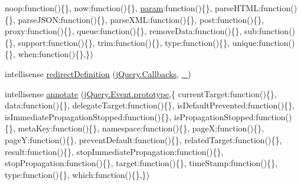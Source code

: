 \begin{DoxyCompactItemize}
\textquotesingle{}noop\textquotesingle{}\+:function()\{\}, \textquotesingle{}now\textquotesingle{}\+:function()\{\}, \textquotesingle{}\hyperlink{_scripts_2jquery-1_810_82_8min_8js_ae8915303d11557d1b001bc56b6195251}{param}\textquotesingle{}\+:function()\{\}, \textquotesingle{}parse\+H\+T\+ML\textquotesingle{}\+:function()\{\}, \textquotesingle{}parse\+J\+S\+ON\textquotesingle{}\+:function()\{\}, \textquotesingle{}parse\+X\+ML\textquotesingle{}\+:function()\{\}, \textquotesingle{}post\textquotesingle{}\+:function()\{\}, \textquotesingle{}proxy\textquotesingle{}\+:function()\{\}, \textquotesingle{}queue\textquotesingle{}\+:function()\{\}, \textquotesingle{}remove\+Data\textquotesingle{}\+:function()\{\}, \textquotesingle{}sub\textquotesingle{}\+:function()\{\}, \textquotesingle{}support\textquotesingle{}\+:function()\{\}, \textquotesingle{}trim\textquotesingle{}\+:function()\{\}, \textquotesingle{}type\textquotesingle{}\+:function()\{\}, \textquotesingle{}unique\textquotesingle{}\+:function()\{\}, \textquotesingle{}when\textquotesingle{}\+:function()\{\},\})
\item 
intellisense \hyperlink{jquery-1_810_82_8intellisense_8js_abeba0f4b2ef2a8a655ac517b37c9fc63}{redirect\+Definition} (\hyperlink{jquery-1_810_82_8intellisense_8js_add8d59d25831bb9b171fdbee8a18795b}{j\+Query.\+Callbacks}, \hyperlink{jquery-1_810_82_8intellisense_8js_af58a9af35e2376001e3219aef7e0bda3}{\+\_})
\item 
intellisense \hyperlink{jquery-1_810_82_8intellisense_8js_a55098c3abe028707512d17d570d3486b}{annotate} (\hyperlink{_scripts_2jquery-1_810_82_8js_ab5e5d0976552f788d31448ed049ae4a4}{j\+Query.\+Event.\+prototype},\{ \textquotesingle{}current\+Target\textquotesingle{}\+:function()\{\}, \textquotesingle{}data\textquotesingle{}\+:function()\{\}, \textquotesingle{}delegate\+Target\textquotesingle{}\+:function()\{\}, \textquotesingle{}is\+Default\+Prevented\textquotesingle{}\+:function()\{\}, \textquotesingle{}is\+Immediate\+Propagation\+Stopped\textquotesingle{}\+:function()\{\}, \textquotesingle{}is\+Propagation\+Stopped\textquotesingle{}\+:function()\{\}, \textquotesingle{}meta\+Key\textquotesingle{}\+:function()\{\}, \textquotesingle{}namespace\textquotesingle{}\+:function()\{\}, \textquotesingle{}pageX\textquotesingle{}\+:function()\{\}, \textquotesingle{}pageY\textquotesingle{}\+:function()\{\}, \textquotesingle{}prevent\+Default\textquotesingle{}\+:function()\{\}, \textquotesingle{}related\+Target\textquotesingle{}\+:function()\{\}, \textquotesingle{}result\textquotesingle{}\+:function()\{\}, \textquotesingle{}stop\+Immediate\+Propagation\textquotesingle{}\+:function()\{\}, \textquotesingle{}stop\+Propagation\textquotesingle{}\+:function()\{\}, \textquotesingle{}target\textquotesingle{}\+:function()\{\}, \textquotesingle{}time\+Stamp\textquotesingle{}\+:function()\{\}, \textquotesingle{}type\textquotesingle{}\+:function()\{\}, \textquotesingle{}which\textquotesingle{}\+:function()\{\},\})

\end{DoxyCompactItemize}
